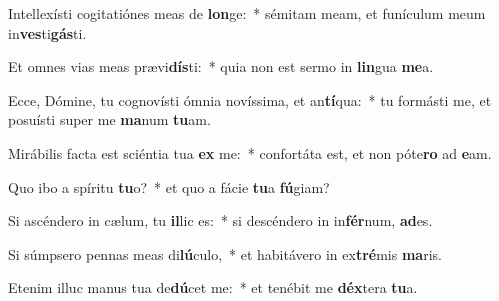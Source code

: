 \item Intellexísti cogitatiónes meas de \textbf{lon}ge:~* sémitam meam, et funículum meum in\textbf{ves}ti\textbf{gás}ti.
\item Et omnes vias meas prævi\textbf{dís}ti:~* quia non est sermo in \textbf{lin}gua \textbf{me}a.
\item Ecce, Dómine, tu cognovísti ómnia novíssima, et an\textbf{tí}qua:~* tu formásti me, et posuísti super me \textbf{ma}num \textbf{tu}am.
\item Mirábilis facta est sciéntia tua \textbf{ex} me:~* confortáta est, et non póte\textbf{ro} ad \textbf{e}am.
\item Quo ibo a spíritu \textbf{tu}o?~* et quo a fácie \textbf{tu}a \textbf{fú}giam?
\item Si ascéndero in cælum, tu \textbf{il}lic es:~* si descéndero in in\textbf{fér}num, \textbf{ad}es.
\item Si súmpsero pennas meas di\textbf{lú}culo,~* et habitávero in ex\textbf{tré}mis \textbf{ma}ris.
\item Etenim illuc manus tua de\textbf{dú}cet me:~* et tenébit me \textbf{déx}tera \textbf{tu}a.

